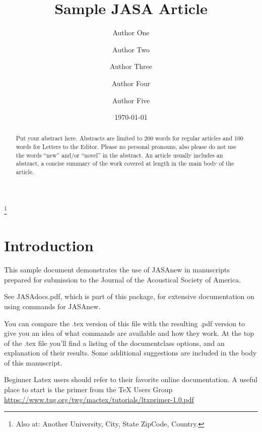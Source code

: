 \documentclass[reprint]{JASAnew}
\begin{document}
\title[JASA/Sample JASA Article]{Sample JASA Article}
\author{Author One}
\author{Author Two}
\author{Author Three}

\author{Author Four}
\thanks{Also at: Another University, City, State ZipCode, Country.}
 
\author{Author Five}			%


\date{\today} 

\begin{abstract}
Put your abstract here. Abstracts are limited to 200 words for
regular articles and 100 words for Letters to the Editor. Please no
personal pronouns, also please do not use the words ``new'' and/or
``novel'' in the abstract. An article usually includes an abstract, a
concise summary of the work covered at length in the main body of the
article.     
\end{abstract}


\maketitle


\section{\label{sec:1} Introduction}
This sample document demonstrates the use of JASAnew in manuscripts 
prepared for submission to the Journal of the Acoustical Society of America. 

See JASAdocs.pdf, which is part of this package, for extensive
documentation on using commands for JASAnew.

You can compare the .tex version of this file with the resulting .pdf
version to give you an idea of what  commands are available and how
they work. At the top of the .tex file you'll find a listing of the
documentclass options, and an explanation of their results.
Some additional suggestions are included in the body of this
manuscript.  

  Beginner Latex users should refer to their favorite online documentation. A 
  useful place to start is the primer from the TeX Users Group 
  \url{https://www.tug.org/twg/mactex/tutorials/ltxprimer-1.0.pdf}
\end{document}
